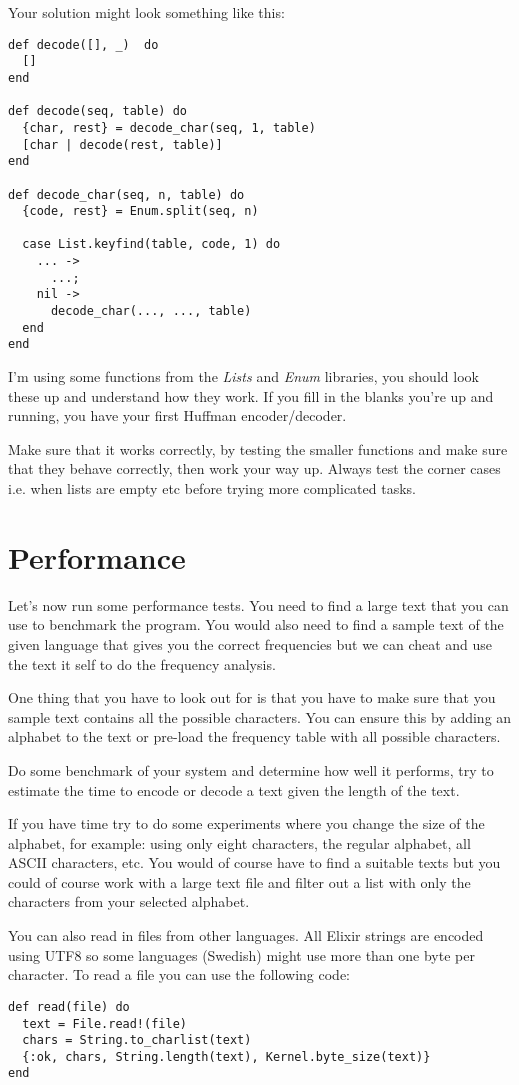 \documentclass[a4paper,11pt]{article}
\begin{document}
Your solution might look something like this:

\begin{verbatim}
def decode([], _)  do
  []
end

def decode(seq, table) do
  {char, rest} = decode_char(seq, 1, table)
  [char | decode(rest, table)]
end

def decode_char(seq, n, table) do
  {code, rest} = Enum.split(seq, n)

  case List.keyfind(table, code, 1) do
    ... ->
      ...;
    nil ->
      decode_char(..., ..., table)
  end
end
\end{verbatim}

I'm using some functions from the {\em Lists} and {\em Enum}
libraries, you should look these up and understand how they work. If
you fill in the blanks you're up and running, you have your first
Huffman encoder/decoder.

Make sure that it works correctly, by testing the smaller functions
and make sure that they behave correctly, then work your way
up. Always test the corner cases i.e. when lists are empty etc before
trying more complicated tasks.



\section{Performance}

Let's now run some performance tests. You need to find a large text
that you can use to benchmark the program. You would also need to find
a sample text of the given language that gives you the correct
frequencies but we can cheat and use the text it self to do the
frequency analysis. 

One thing that you have to look out for is that you have to make sure
that you sample text contains all the possible characters. You can
ensure this by adding an alphabet to the text or pre-load the
frequency table with all possible characters.

Do some benchmark of your system and determine how well it
performs, try to estimate the time to encode or decode a text given
the length of the text. 

If you have time try to do some experiments where you change the size
of the alphabet, for example: using only eight characters, the regular
alphabet, all ASCII characters, etc. You would of course have to find a
suitable texts but you could of course work with a large text file and
filter out a list with only the characters from your selected alphabet.

You can also read in files from other languages. All Elixir strings
are encoded using UTF8 so some languages (Swedish) might use more than
one byte per character. To read a file you can use the following code:

\begin{verbatim}
def read(file) do
  text = File.read!(file)
  chars = String.to_charlist(text)
  {:ok, chars, String.length(text), Kernel.byte_size(text)}
end
\end{verbatim}
\end{document}
